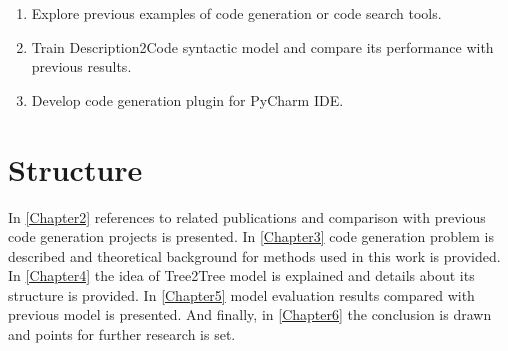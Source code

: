 \begin{enumerate}
	\item Explore previous examples of code generation or code search tools.
	\item Train Description2Code syntactic model and compare its performance with previous results.
	\item Develop code generation plugin for PyCharm IDE.
\end{enumerate}

\section{Structure}
In \ref{Chapter2} references to related publications and comparison with previous code generation projects is  presented. In \ref{Chapter3} code generation problem is described and theoretical background for methods used in this work is provided. In \ref{Chapter4} the idea of Tree2Tree model is explained and details about its structure is provided. In \ref{Chapter5} model evaluation results compared with previous model is presented. And finally, in \ref{Chapter6} the conclusion is drawn and points for further research is set.